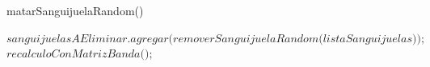 \begin{algorithm}
\caption{matarSanguijuelaRandom()}\label{euclid}
\begin{algorithmic}[1]
\State $\textit{sanguijuelasAEliminar.agregar(removerSanguijuelaRandom(listaSanguijuelas));}$ 
\State $\textit{recalculoConMatrizBanda();}$
\end{algorithmic}
\end{algorithm}

